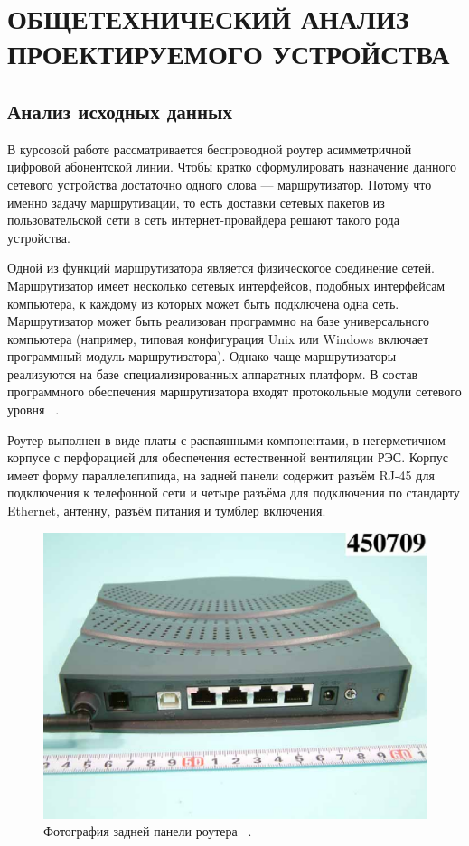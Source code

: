 \section{ОБЩЕТЕХНИЧЕСКИЙ АНАЛИЗ ПРОЕКТИРУЕМОГО УСТРОЙСТВА}
\subsection{Анализ исходных данных}

В курсовой работе рассматривается беспроводной роутер асимметричной
цифровой абонентской линии.  Чтобы кратко сформулировать назначение
данного сетевого устройства достаточно одного слова — маршрутизатор.
Потому что именно задачу маршрутизации, то есть доставки сетевых
пакетов из пользовательской сети в сеть интернет-провайдера решают
такого рода устройства.


Одной из функций маршрутизатора является физическогое соединение
сетей. Маршрутизатор имеет несколько сетевых интерфейсов, подобных
интерфейсам компьютера, к каждому из которых может быть подключена
одна сеть. Маршрутизатор может быть реализован программно на базе
универсального компьютера (например, типовая конфигурация Unix или
Windows включает программный модуль маршрутизатора). Однако чаще
маршрутизаторы реализуются на базе специализированных аппаратных
платформ. В состав программного обеспечения маршрутизатора входят
протокольные модули сетевого уровня ~\cite{NetworksOlifer2016}.

Роутер выполнен в виде платы с распаянными компонентами, в
негерметичном корпусе с перфорацией для обеспечения естественной
вентиляции РЭС. Корпус имеет форму параллелепипида, на задней панели
содержит разъём RJ-45 для подключения к телефонной сети и четыре
разъёма для подключения по стандарту Ethernet, антенну, разъём питания
и тумблер включения.

\begin{figure}[h] %
  \centering
\includegraphics[scale = 0.5]{images/external_photos-2.png}
\caption{Фотография задней панели роутера ~\cite{EXTERNAL-PHOTOS}.}

\end{figure}

